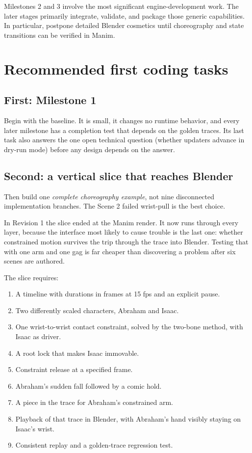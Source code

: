 \documentclass[12pt,letterpaper]{article}
\newcommand{\file}[1]{\texttt{\detokenize{#1}}}
\begin{document}
Milestones 2 and 3 involve the most significant engine-development work. The later stages primarily integrate, validate, and package those generic capabilities. In particular, postpone detailed Blender cosmetics until choreography and state transitions can be verified in Manim.

\section{Recommended first coding tasks}
\label{sec:slice}

\subsection{First: Milestone 1}
Begin with the baseline. It is small, it changes no runtime behavior, and every later milestone has a completion test that depends on the golden traces. Its last task also answers the one open technical question (whether updaters advance in dry-run mode) before any design depends on the answer.

\subsection{Second: a vertical slice that reaches Blender}
Then build one \emph{complete choreography example}, not nine disconnected implementation branches. The Scene 2 failed wrist-pull is the best choice.

In Revision 1 the slice ended at the Manim render. It now runs through every layer, because the interface most likely to cause trouble is the last one: whether constrained motion survives the trip through the trace into Blender. Testing that with one arm and one gag is far cheaper than discovering a problem after six scenes are authored.

The slice requires:
\begin{enumerate}
\item A timeline with durations in frames at 15 fps and an explicit pause.
\item Two differently scaled characters, Abraham and Isaac.
\item One wrist-to-wrist contact constraint, solved by the two-bone method, with Isaac as driver.
\item A root lock that makes Isaac immovable.
\item Constraint release at a specified frame.
\item Abraham's sudden fall followed by a comic hold.
\item A \file{sampled} piece in the trace for Abraham's constrained arm.
\item Playback of that trace in Blender, with Abraham's hand visibly staying on Isaac's wrist.
\item Consistent replay and a golden-trace regression test.
\end{enumerate}
\end{document}
